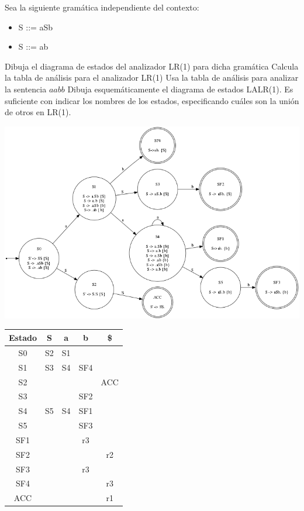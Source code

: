 \documentclass[nochap]{apuntes}
\begin{document}
\begin{problem}
Sea la siguiente gramática independiente del contexto:
\begin{itemize}
\item S ::= aSb
\item S ::= ab
\end{itemize}
\ppart Dibuja el diagrama de estados del analizador LR(1) para dicha gramática
\ppart Calcula la tabla de análisis para el analizador LR(1)
\ppart Usa la tabla de análisis para analizar la sentencia $aabb$
\ppart Dibuja esquemáticamente el diagrama de estados LALR(1). Es suficiente con indicar los nombres de los estados, especificando cuáles son la unión de otros en LR(1).
\solution
\ppart
\begin{center}
\includegraphics[scale=0.65]{automata_H3E8.png}
\end{center}

\ppart
\begin{tabular}{| c | c | c | c | c |}
\hline
Estado & S & a & b & \$\\
\hline
S0 & S2 & S1 & & \\
\hline
S1 & S3 & S4 & SF4 & \\
\hline
S2 & & & & ACC \\
\hline
S3 & & & SF2 & \\
\hline
S4 & S5 & S4 & SF1 & \\
\hline
S5 & & & SF3 & \\
\hline
SF1 & & & r3 & \\
\hline
SF2 & & & & r2\\
\hline
SF3 & & & r3 & \\
\hline
SF4 & & & & r3 \\
\hline
ACC & & & & r1 \\
\hline
\end{tabular}


\end{problem}
\end{document}
